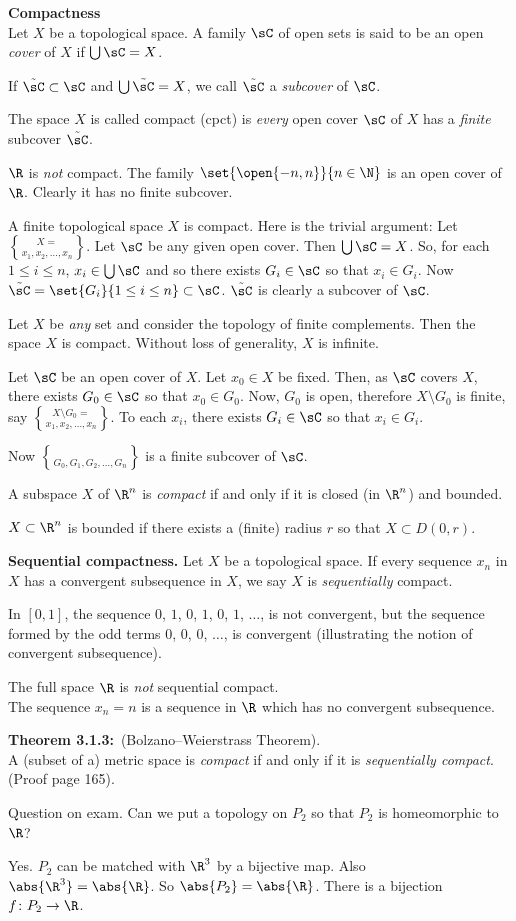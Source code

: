 \textbf{Compactness} \\
Let $X$ be a topological space.  A family $\sC$ of open sets is said to be an open \emph{cover} of $X$ if $\bigcup\sC=X$.

If $\tilde\sC\subset\sC$ and $\bigcup\tilde\sC=X$, we call $\tilde\sC$ a \emph{subcover} of $\sC$.

The space $X$ is called compact (cpct) is \emph{every} open cover $\sC$ of $X$ has a \emph{finite} subcover $\tilde\sC$.

\eg $\R$ is \emph{not} compact.  The family $\set{\open{-n,n}}{n\in\N}$ is an open cover of $\R$.  Clearly it has no finite subcover.

A finite topological space $X$ is compact.  Here is the trivial argument: Let $X=\brace{x_1,x_2,\dotsc,x_n}$.  Let $\sC$ be any given open cover.  Then $\bigcup\sC=X$.  So, for each $1\leq i\leq n$, $x_i\in\bigcup\sC$ and so there exists $G_i\in\sC$ so that $x_i\in G_i$.  Now $\tilde\sC=\set{G_i}{1\leq i\leq n}\subset\sC$.  $\tilde\sC$ is clearly a subcover of $\sC$.

Let $X$ be \emph{any} set and consider the topology of finite complements.  Then the space $X$ is compact.  Without loss of generality, $X$ is infinite.

\pf Let $\sC$ be an open cover of $X$.  Let $x_0\in X$ be fixed.  Then, as $\sC$ covers $X$, there exists $G_0\in\sC$ so that $x_0\in G_0$.  Now, $G_0$ is open, therefore $X\setminus G_0$ is finite, say $X\setminus G_0=\brace{x_1,x_2,\dotsc,x_n}$.  To each $x_i$, there exists $G_i\in\sC$ so that $x_i\in G_i$.

Now $\brace{G_0,G_1,G_2,\dotsc,G_n}$ is a finite subcover of $\sC$.

\thm A subspace $X$ of $\R^n$ is \emph{compact} if and only if it is closed (in $\R^n$) and bounded.

 $X\subset\R^n$ is bounded if there exists a (finite) radius $r$ so that $X\subset D(0,r)$.

 \textbf{Sequential compactness.} Let $X$ be a topological space.  If every sequence $x_n$ in $X$ has a convergent subsequence in $X$, we say $X$ is \emph{sequentially} compact.

\eg In $[0,1]$, the sequence $0$, $1$, $0$, $1$, $0$, $1$, $\dotsc$, is not convergent, but the sequence formed by the odd terms $0$, $0$, $0$, $\dotsc$, is convergent (illustrating the notion of convergent subsequence).

The full space $\R$ is \emph{not} sequential compact. \\
\pf The sequence $x_n=n$ is a sequence in $\R$ which has no convergent subsequence.

\textbf{Theorem 3.1.3:}~(Bolzano--Weierstrass Theorem). \\
A (subset of a) metric space is \emph{compact} if and only if it is \emph{sequentially compact}.  (Proof page 165).

Question on exam.  Can we put a topology on $P_2$ so that $P_2$ is homeomorphic to $\R$?

Yes.  $P_2$ can be matched with $\R^3$ by a bijective map.  Also $\abs{\R^3}=\abs{\R}$.  So $\abs{P_2}=\abs{\R}$.  There is a bijection $f\colon P_2\to\R$.
